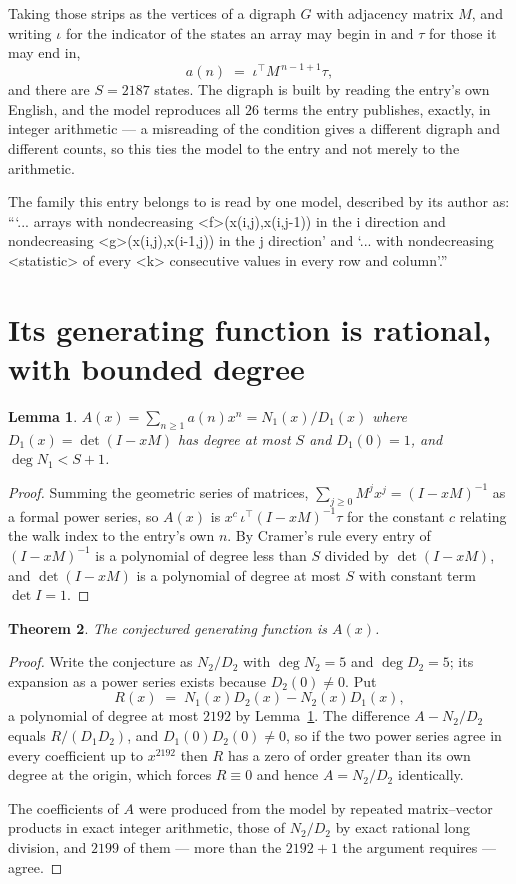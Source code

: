 \documentclass[11pt,a4paper]{article}
\theoremstyle{plain}
\newtheorem{theorem}{Theorem}
\newtheorem{lemma}[theorem]{Lemma}
\theoremstyle{definition}
\begin{document}
Taking those strips as the vertices of a digraph $G$ with adjacency matrix $M$, and writing
$\iota$ for the indicator of the states an array may begin in and $\tau$ for those it may end
in,
\[
a(n)\;=\;\iota^{\!\top}M^{\,n-1+1}\tau ,
\]
and there are $S=2187$ states. The digraph is built by reading the entry's own English, and the
model reproduces all $26$ terms the entry publishes, exactly, in integer arithmetic --- a
misreading of the condition gives a different digraph and different counts, so this ties the
model to the entry and not merely to the arithmetic.

The family this entry belongs to is read by one model, described by its author as: ```... arrays with nondecreasing <f>(x(i,j),x(i,j-1)) in the i direction and nondecreasing <g>(x(i,j),x(i-1,j)) in the j direction' and `... with nondecreasing <statistic> of every <k> consecutive values in every row and column'.''


\section{Its generating function is rational, with bounded degree}

\begin{lemma}\label{lem:rat}
$A(x)=\sum_{n\ge1}a(n)x^n=N_1(x)/D_1(x)$ where $D_1(x)=\det(I-xM)$ has degree at most
$S$ and $D_1(0)=1$, and $\deg N_1<S+1$.
\end{lemma}

\begin{proof}
Summing the geometric series of matrices, $\sum_{j\ge0}M^jx^j=(I-xM)^{-1}$ as a formal
power series, so $A(x)$ is $x^{c}\,\iota^{\!\top}(I-xM)^{-1}\tau$ for the constant $c$
relating the walk index to the entry's own $n$. By Cramer's rule every entry of
$(I-xM)^{-1}$ is a polynomial of degree less than $S$ divided by $\det(I-xM)$, and
$\det(I-xM)$ is a polynomial of degree at most $S$ with constant term $\det I=1$.
\end{proof}

\begin{theorem}
The conjectured generating function is $A(x)$.
\end{theorem}

\begin{proof}
Write the conjecture as $N_2/D_2$ with $\deg N_2=5$ and $\deg D_2=5$; its expansion as a
power series exists because $D_2(0)\neq0$. Put
\[
R(x)\;=\;N_1(x)D_2(x)-N_2(x)D_1(x),
\]
a polynomial of degree at most $2192$ by Lemma~\ref{lem:rat}. The difference
$A-N_2/D_2$ equals $R/(D_1D_2)$, and $D_1(0)D_2(0)\neq0$, so if the two power series agree in
every coefficient up to $x^{2192}$ then $R$ has a zero of order greater than its own
degree at the origin, which forces $R\equiv0$ and hence $A=N_2/D_2$ identically.

The coefficients of $A$ were produced from the model by repeated matrix--vector products in
exact integer arithmetic, those of $N_2/D_2$ by exact rational long division, and $2199$
of them --- more than the $2192+1$ the argument requires --- agree.
\end{proof}
\end{document}
